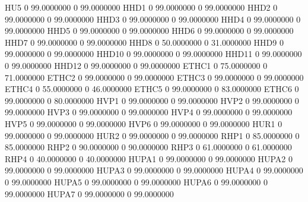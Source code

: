\documentclass[
  11pt,
  a4paper,
  DIV=12,captions=tableheading,oneside,titlepage]{scrbook}
\let\oldverbatim\verbatim
\let\endoldverbatim\endverbatim
\renewenvironment{verbatim}{\footnotesize\oldverbatim}{\endoldverbatim}
\begin{document}
\begin{verbatim}
  HU5                    0    99.0000000             0    99.0000000 
  HHD1                   0    99.0000000             0    99.0000000 
  HHD2                   0    99.0000000             0    99.0000000 
  HHD3                   0    99.0000000             0    99.0000000 
  HHD4                   0    99.0000000             0    99.0000000 
  HHD5                   0    99.0000000             0    99.0000000 
  HHD6                   0    99.0000000             0    99.0000000 
  HHD7                   0    99.0000000             0    99.0000000 
  HHD8                   0    50.0000000             0    31.0000000 
  HHD9                   0    99.0000000             0    99.0000000 
  HHD10                  0    99.0000000             0    99.0000000 
  HHD11                  0    99.0000000             0    99.0000000 
  HHD12                  0    99.0000000             0    99.0000000 
  ETHC1                  0    75.0000000             0    71.0000000 
  ETHC2                  0    99.0000000             0    99.0000000 
  ETHC3                  0    99.0000000             0    99.0000000 
  ETHC4                  0    55.0000000             0    46.0000000 
  ETHC5                  0    99.0000000             0    83.0000000 
  ETHC6                  0    99.0000000             0    80.0000000 
  HVP1                   0    99.0000000             0    99.0000000 
  HVP2                   0    99.0000000             0    99.0000000 
  HVP3                   0    99.0000000             0    99.0000000 
  HVP4                   0    99.0000000             0    99.0000000 
  HVP5                   0    99.0000000             0    99.0000000 
  HVP6                   0    99.0000000             0    99.0000000 
  HUR1                   0    99.0000000             0    99.0000000 
  HUR2                   0    99.0000000             0    99.0000000 
  RHP1                   0    85.0000000             0    85.0000000 
  RHP2                   0    90.0000000             0    90.0000000 
  RHP3                   0    61.0000000             0    61.0000000 
  RHP4                   0    40.0000000             0    40.0000000 
  HUPA1                  0    99.0000000             0    99.0000000 
  HUPA2                  0    99.0000000             0    99.0000000 
  HUPA3                  0    99.0000000             0    99.0000000 
  HUPA4                  0    99.0000000             0    99.0000000 
  HUPA5                  0    99.0000000             0    99.0000000 
  HUPA6                  0    99.0000000             0    99.0000000 
  HUPA7                  0    99.0000000             0    99.0000000 

\end{verbatim}
\end{document}
